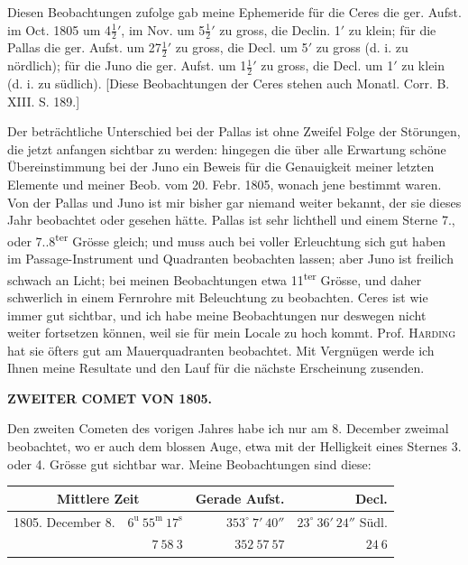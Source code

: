 \par\indent Diesen Beobachtungen zufolge gab meine Ephemeride für die Ceres die ger. Aufst. im Oct. 1805 um 4$\frac{1}{2}'$, im Nov. um 5$\frac{1}{2}'$ zu gross, die Declin. 1$'$ zu klein; für die Pallas die ger. Aufst. um 27$\frac{1}{2}'$ zu gross, die Decl. um 5$'$ zu gross (d. i. zu nördlich); für die Juno die ger. Aufst. um 1$\frac{1}{2}'$ zu gross, die Decl. um 1$'$ zu klein (d. i. zu südlich). [Diese Beobachtungen der Ceres stehen auch Monatl. Corr. B. XIII. S. 189.]



\par\indent Der beträchtliche Unterschied bei der Pallas ist ohne Zweifel Folge der Störungen, die jetzt anfangen sichtbar zu werden: hingegen die über alle Erwartung schöne Übereinstimmung bei der Juno ein Beweis für die Genauigkeit meiner letzten Elemente und meiner Beob. vom 20. Febr. 1805, wonach jene bestimmt waren. Von der Pallas und Juno ist mir bisher gar niemand weiter bekannt, der sie dieses Jahr beobachtet oder gesehen hätte. Pallas ist sehr lichthell und einem Sterne 7., oder 7..8\textsuperscript{ter} Grösse gleich; und muss auch bei voller Erleuchtung sich gut haben im Passage-Instrument und Quadranten beobachten lassen; aber Juno ist freilich schwach an Licht; bei meinen Beobachtungen etwa 11\textsuperscript{ter} Grösse, und daher schwerlich in einem Fernrohre mit Beleuchtung zu beobachten. Ceres ist wie immer gut sichtbar, und ich habe meine Beobachtungen nur deswegen nicht weiter fortsetzen können, weil sie für mein Locale zu hoch kommt. Prof. \textsc{Harding} hat sie öfters gut am Mauerquadranten beobachtet. Mit Vergnügen werde ich Ihnen meine Resultate und den Lauf für die nächste Erscheinung zusenden.

\par\clearpage
\thispagestyle{empty}
\noindent{}%
%
\parbox[t]{\dimexpr\linewidth-24mm\relax}{\centering\footnotesize\bfseries ZWEITER COMET VON 1805.\par}%
\makebox[12mm][r]{}\par\nobreak\medskip

\par\indent Den zweiten Cometen des vorigen Jahres habe ich nur am 8. December zweimal beobachtet, wo er auch dem blossen Auge, etwa mit der Helligkeit eines Sternes 3. oder 4. Grösse gut sichtbar war. Meine Beobachtungen sind diese:
\begin{center}
\begingroup\fontsize{9}{11}\selectfont\setlength{\tabcolsep}{2pt}\renewcommand{\arraystretch}{1.1}
\begin{tabular}{lr|r|r}
\multicolumn{2}{c|}{Mittlere Zeit} & Gerade Aufst. & Decl.\\ \hline
1805. December 8. & $6^{\mathrm u}\ 55^{\mathrm m}\ 17^{\mathrm s}$ & $353^\circ\ 7'\ 40''$ & $23^\circ\ 36'\ 24''$ Südl.\\
& $7\ 58\ 3$ & $352\ 57\ 57$ & $24\ 6$\\
\end{tabular}\endgroup
\end{center}

